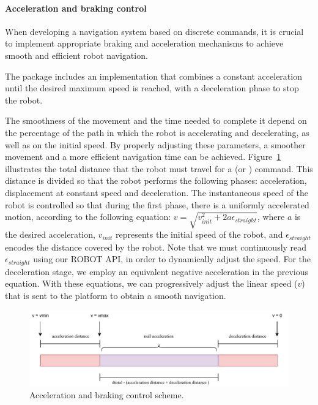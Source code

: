 \paragraph{\textbf{Acceleration and braking control}}\label{par:start-and-brake-control}

When developing a navigation system based on discrete commands, it is crucial to implement appropriate braking and acceleration mechanisms to achieve smooth and efficient robot navigation.

The package includes an implementation that combines a constant acceleration until the desired maximum speed is reached, with a deceleration phase to stop the robot.

The smoothness of the movement and the time needed to complete it depend on the percentage of the path in which the robot is accelerating and decelerating, as well as on the initial speed.
By properly adjusting these parameters, a smoother movement and a more efficient navigation time can be achieved.
Figure~\ref{fig:acceleration_stop} illustrates the total distance that the robot must travel for a \moveforward (or \movebackward) command.
This distance is divided so that the robot performs the following phases: acceleration, displacement at constant speed and deceleration.
The instantaneous speed of the robot is controlled so that during the first phase, there is a uniformly accelerated motion, according to the following equation: $v = \sqrt{v_{init}^2 + 2 a \epsilon_{straight}}$, where $a$ is the desired acceleration, $v_{init}$ represents the initial speed of the robot, and $\epsilon_{straight}$ encodes the distance covered by the robot.
Note that we must continuously read $\epsilon_{straight}$ using our ROBOT API, in order to dynamically adjust the speed.
For the deceleration stage, we employ an equivalent negative acceleration in the previous equation.
With these equations, we can progressively adjust the linear speed ($v$) that is sent to the platform to obtain a smooth navigation.

\begin{figure}
    \centering
    \includegraphics[width=\linewidth]{figures/ros4vsn/move_robot_acceleration}
    \caption{Acceleration and braking control scheme.}
    \label{fig:acceleration_stop}
\end{figure}

